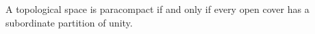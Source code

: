 A topological space is paracompact if and only if every open cover has a subordinate partition of unity.
